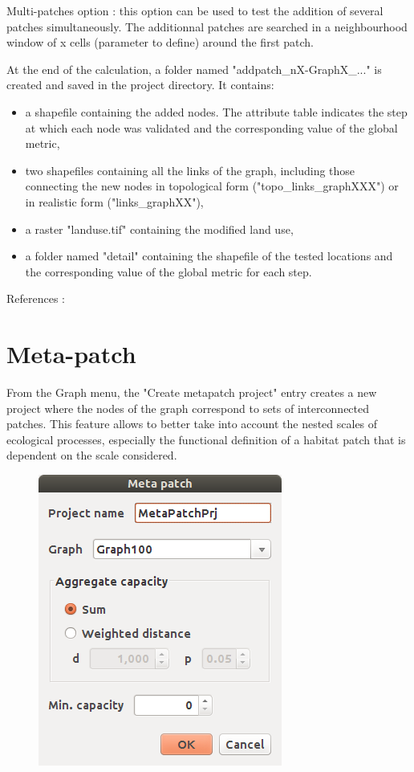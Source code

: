 \documentclass{article}
\begin{document}
Multi-patches option : this option can be used to test the addition of several patches simultaneously. The additionnal patches are searched in a neighbourhood window of x cells (parameter to define) around the first patch.

At the end of the calculation, a folder named "addpatch\_nX-GraphX\_..." is created and saved in the project directory. It contains:
\begin{itemize}
	\item a shapefile containing the added nodes. The attribute table indicates the step at which each node was validated and the corresponding value of the  global metric,
	\item two shapefiles containing all the links of the graph, including those connecting the new nodes in topological form ("topo\_links\_graphXXX") or in realistic form ("links\_graphXX"),
	\item a raster "landuse.tif" containing the modified land use,
	\item a folder named "detail" containing the shapefile of the tested locations and the corresponding value of the global metric for each step. 
\end{itemize}

References : 
\cite{2015_addpatch_rainette, 2014_LUP}



\section{Meta-patch}

From the Graph menu, the "Create metapatch project" entry creates a new project where the nodes of the graph correspond to sets of interconnected patches. This feature allows to better take into account the nested scales of ecological processes, especially the functional definition of a habitat patch that is dependent on the scale considered.

\begin{figure}[H]
	\includegraphics[scale=0.5]{img/manual-en_metapatch.png} 
\end{figure}
\end{document}
